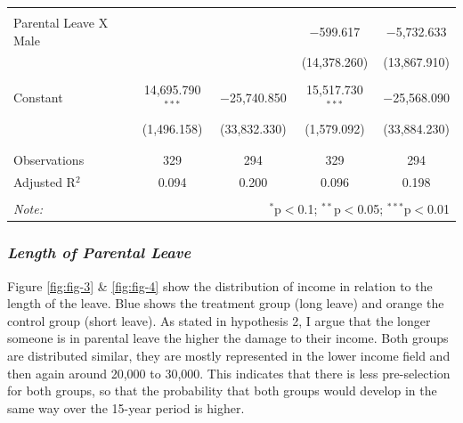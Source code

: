 \documentclass[
  12pt,
]{article}
\begin{document}
\begin{table}[!htbp]
\begin{tabular}{@{\extracolsep{-5pt}}lcccc}
  & & & & \\ 
 Parental Leave X Male &  &  & $-$599.617 & $-$5,732.633 \\ 
  &  &  & (14,378.260) & (13,867.910) \\ 
  & & & & \\ 
 Constant & 14,695.790$^{***}$ & $-$25,740.850 & 15,517.730$^{***}$ & $-$25,568.090 \\ 
  & (1,496.158) & (33,832.330) & (1,579.092) & (33,884.230) \\ 
  & & & & \\ 
\hline \\[-1.8ex] 
Observations & 329 & 294 & 329 & 294 \\ 
Adjusted R$^{2}$ & 0.094 & 0.200 & 0.096 & 0.198 \\ 
\hline 
\hline \\[-1.8ex] 
\textit{Note:}  & \multicolumn{4}{r}{$^{*}$p$<$0.1; $^{**}$p$<$0.05; $^{***}$p$<$0.01} \\ 
\end{tabular} 
\end{table}

\hypertarget{length-of-parental-leave}{%
\subsubsection*{\texorpdfstring{\emph{Length of Parental Leave}}{Length of Parental Leave}}\label{length-of-parental-leave}}

Figure \ref{fig:fig-3} \& \ref{fig:fig-4} show the distribution of income in relation to the length of the leave. Blue shows the treatment group (long leave) and orange the control group (short leave). As stated in hypothesis 2, I argue that the longer someone is in parental leave the higher the damage to their income. Both groups are distributed similar, they are mostly represented in the lower income field and then again around 20,000 to 30,000. This indicates that there is less pre-selection for both groups, so that the probability that both groups would develop in the same way over the 15-year period is higher.
\end{document}
